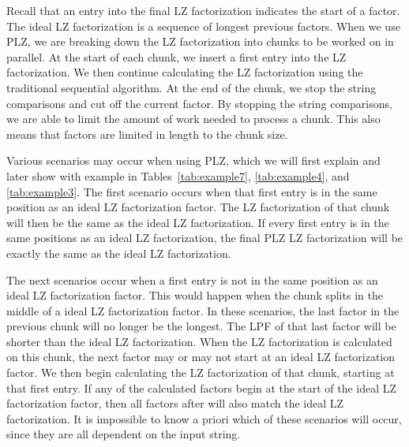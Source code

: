 Recall that an entry into the final LZ factorization indicates the start of a factor.
The ideal LZ factorization is a sequence of longest previous factors.
When we use PLZ, we are breaking down the LZ factorization into chunks to be worked on in parallel.
At the start of each chunk, we insert a first entry into the LZ factorization.
We then continue calculating the LZ factorization using the traditional sequential algorithm.
At the end of the chunk, we stop the string comparisons and cut off the current factor.
By stopping the string comparisons, we are able to limit the amount of work needed to process a chunk.
This also means that factors are limited in length to the chunk size.

Various scenarios may occur when using PLZ, which we will first explain and later show with example in Tables~\ref{tab:example7}, \ref{tab:example4}, and \ref{tab:example3}. 
The first scenario occurs when that first entry is in the same position as an ideal LZ factorization factor.
The LZ factorization of that chunk will then be the same as the ideal LZ factorization.
If every first entry is in the same positions as an ideal LZ factorization, the final PLZ LZ factorization will be exactly the same as the ideal LZ factorization.

The next scenarios occur when a first entry is not in the same position as an ideal LZ factorization factor.
This would happen when the chunk splits in the middle of a ideal LZ factorization factor.
In these scenarios, the last factor in the previous chunk will no longer be the longest.
The LPF of that last factor will be shorter than the ideal LZ factorization.
When the LZ factorization is calculated on this chunk, the next factor may or may not start at an ideal LZ factorization factor.
We then begin calculating the LZ factorization of that chunk, starting at that first entry.
If any of the calculated factors begin at the start of the ideal LZ factorization factor, then all factors after will also match the ideal LZ factorization.
It is impossible to know a priori which of these scenarios will occur, since they are all dependent on the input string.

